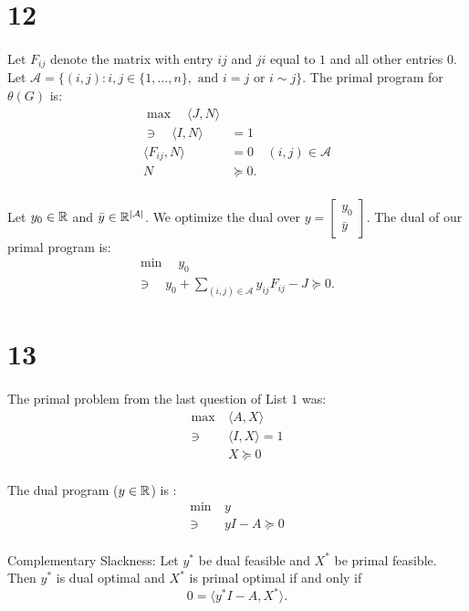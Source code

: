 \documentclass[letterpaper,12pt,oneside,onecolumn]{article}
\newcommand{\1}{\mathbbm{1}}
\newcommand{\cA}{\mathcal{A}} \newcommand{\cB}{\mathcal{B}}
\begin{document}
\section*{12}
\paragraph{}
Let $F_{ij}$ denote the matrix with entry $ij$ and $ji$ equal to $1$ and all other entries $0$. Let $\cA = \{ (i,j) : i,j \in \{1, \dots, n\}, \text{ and $i=j$ or $i\sim j$}\}$. The primal program for $\theta(G)$ is:
\begin{align*}
\max\quad \langle J, N \rangle&\ \\
\ni\quad \langle I, N \rangle &= 1 \\
\langle F_{ij}, N \rangle &= 0 &\text{$(i,j) \in \cA$}\\
N &\succcurlyeq 0.
\end{align*}
\paragraph{} 
Let $y_0 \in \mathbb{R}$ and $\bar{y} \in \R^{|\cA|}$. We optimize the dual over $y = \begin{bmatrix} y_0 \\ \bar{y} \end{bmatrix}$. The dual of our primal program is:
\begin{align*}
&\min\quad y_0&\ \\
&\ni\quad  y_0+ \sum_{(i,j) \in \cA} y_{ij}F_{ij} - J \succcurlyeq 0.
\end{align*}
\section*{13}
\paragraph{}
The primal problem from the last question of List $1$ was:
\begin{align*}
\max\ &\langle A, X \rangle \\
\ni\ &\langle I, X\rangle = 1\\
&X \succcurlyeq 0
\end{align*}
\paragraph{}
The dual program ($y \in \mathbb{R}$) is :
\begin{align*}
\min\ &y \\
\ni\ &yI - A \succcurlyeq 0
\end{align*}
\paragraph{}
Complementary Slackness: Let $y^*$ be dual feasible and $X^*$ be primal feasible. Then $y^*$ is dual optimal and $X^*$ is primal optimal if and only if
$$ 0 = \langle y^*I - A,X^*\rangle.$$
\end{document}
